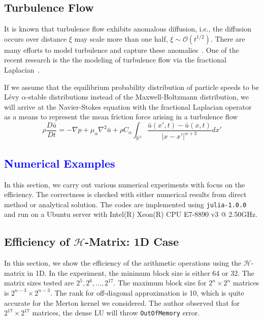 \documentclass[3p,,preprint,12pt]{elsarticle}
\newcommand{\RR}[0]{\mathbb{R}}
\newcommand{\lib}[1]{\textcolor{blue}{\section{#1}}}
\theoremstyle{definition}
\begin{document}
\subsection{Turbulence Flow}

It is known that turbulence flow exhibits anomalous diffusion, i.e., the diffusion occurs over distance $\xi$ may scale more than one half, $\xi\sim\mathcal{O}(t^{1/2})$. There are many efforts to model turbulence and capture these anomalies~\cite{chen2010anomalous,chen2006speculative}. One of the recent research is the the modeling of turbulence flow via the fractional Laplacian~\cite{epps2018turbulence}. 

If we assume that the equilibrium probability distribution of particle speeds to be L\'evy $\alpha$-stable distributions instead of the Maxwell-Boltzmann distribution, we will arrive at the Navier-Stokes equation with the fractional Laplacian operator as a means to represent the mean friction force arising in a turbulence flow
\begin{equation}
	\rho\frac{D\bar u}{Dt} = -\nabla p + \mu_\alpha \nabla^2 \bar u + \rho C_\alpha \int_{\RR^3} \frac{\bar u(x',t)-\bar u(x,t)}{|x-x'|^{\alpha+3}} dx'
\end{equation}



\lib{Numerical Examples}

In this section, we carry out various numerical experiments with focus on the efficiency. The correctness is checked with either numerical results from direct method or analytical solution. The codes are implemented using \texttt{julia-1.0.0} and run on a Ubuntu server with Intel(R) Xeon(R) CPU E7-8890 v3 @ 2.50GHz. 

\subsection{Efficiency of $\mathcal{H}$-Matrix: 1D Case}

In this section, we show the efficiency of the arithmetic operations using the $\mathcal{H}$-matrix in 1D. In the experiment, the minimum block size is either 64 or 32. The matrix sizes tested are $2^5, 2^6, \ldots, 2^{17}$. The maximum block size for $2^n\times 2^n$ matrices is $2^{n-3}\times 2^{n-3}$. The rank for off-diagonal approximation is 10, which is quite accurate for the Merton kernel we considered. The author observed that for $2^{17}\times 2^{17}$ matrices, the dense LU will throw \texttt{OutOfMemory} error. 
\end{document}
